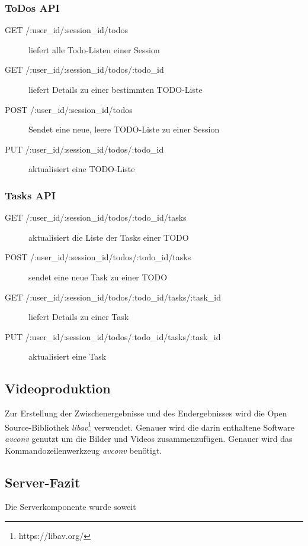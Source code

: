 \subsubsection{ToDos API}

\begin{description}

	\item[GET /:user\_id/:session\_id/todos] liefert alle Todo-Listen einer Session	
	\item[GET /:user\_id/:session\_id/todos/:todo\_id] liefert Details zu einer bestimmten TODO-Liste	
	\item[POST /:user\_id/:session\_id/todos] Sendet eine neue, leere TODO-Liste zu einer Session
	
	\item[PUT /:user\_id/:session\_id/todos/:todo\_id] aktualisiert eine TODO-Liste
	
\end{description}

\subsubsection{Tasks API}

\begin{description}

	\item[GET /:user\_id/:session\_id/todos/:todo\_id/tasks] aktualisiert die Liste der Tasks einer TODO	
	\item[POST /:user\_id/:session\_id/todos/:todo\_id/tasks] sendet eine neue Task zu einer TODO
	
	\item[GET /:user\_id/:session\_id/todos/:todo\_id/tasks/:task\_id] liefert Details zu einer Task
	
	\item[PUT /:user\_id/:session\_id/todos/:todo\_id/tasks/:task\_id] aktualisiert eine Task
	  
\end{description}


\subsection{Videoproduktion}

Zur Erstellung der Zwischenergebnisse und des Endergebnisses wird die Open Source-Bibliothek \emph{libav}\footnote{https://libav.org/} verwendet. Genauer wird die darin enthaltene Software \emph{avconv} genutzt um die Bilder und Videos zusammenzufügen. Genauer wird das Kommandozeilenwerkzeug \textit{avconv} benötigt.

\subsection{Server-Fazit}

Die Serverkomponente wurde soweit 

